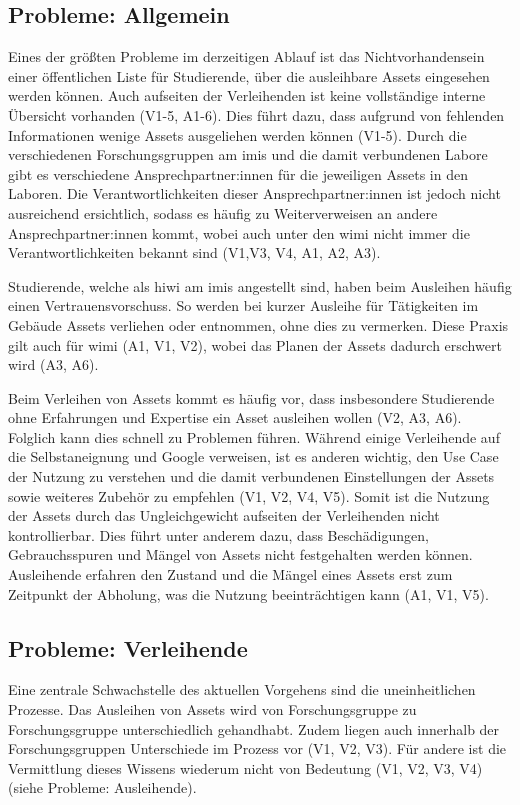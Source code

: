 \subsection{Probleme: Allgemein}
\label{section:probleme-allgemein}
Eines der größten Probleme im derzeitigen Ablauf ist das Nichtvorhandensein
einer öffentlichen Liste für Studierende, über die ausleihbare Assets eingesehen
werden können. Auch aufseiten der Verleihenden ist keine vollständige interne
Übersicht vorhanden (V1-5, A1-6). Dies führt dazu, dass aufgrund von fehlenden
Informationen wenige Assets ausgeliehen werden können (V1-5). Durch die
verschiedenen Forschungsgruppen am \ac{imis} und die damit verbundenen Labore
gibt es verschiedene Ansprechpartner:innen für die jeweiligen Assets in den
Laboren. Die Verantwortlichkeiten dieser Ansprechpartner:innen ist jedoch nicht
ausreichend ersichtlich, sodass es häufig zu Weiterverweisen an andere
Ansprechpartner:innen kommt, wobei auch unter den \ac{wimi} nicht immer die
Verantwortlichkeiten bekannt sind (V1,V3, V4, A1, A2, A3).

Studierende, welche als \ac{hiwi} am \ac{imis} angestellt sind, haben beim Ausleihen häufig einen
Vertrauensvorschuss. So werden bei kurzer Ausleihe für Tätigkeiten im Gebäude Assets verliehen oder
entnommen, ohne dies zu vermerken. Diese Praxis gilt auch für \ac{wimi} (A1, V1, V2), wobei das
Planen der Assets dadurch erschwert wird (A3, A6).

Beim Verleihen von Assets kommt es häufig vor, dass insbesondere Studierende
ohne Erfahrungen und Expertise ein Asset ausleihen wollen (V2, A3, A6). Folglich
kann dies schnell zu Problemen führen. Während einige Verleihende auf die
Selbstaneignung und Google verweisen, ist es anderen wichtig, den Use Case der
Nutzung zu verstehen und die damit verbundenen Einstellungen der Assets sowie
weiteres Zubehör zu empfehlen (V1, V2, V4, V5). Somit ist die Nutzung der Assets
durch das Ungleichgewicht aufseiten der Verleihenden nicht kontrollierbar. Dies
führt unter anderem dazu, dass Beschädigungen, Gebrauchsspuren und Mängel von
Assets nicht festgehalten werden können. Ausleihende erfahren den Zustand und
die Mängel eines Assets erst zum Zeitpunkt der Abholung, was die Nutzung
beeinträchtigen kann (A1, V1, V5).

\subsection{Probleme: Verleihende}
\label{section:probleme-verleihende}
Eine zentrale Schwachstelle des aktuellen Vorgehens sind die uneinheitlichen
Prozesse. Das Ausleihen von Assets wird von Forschungsgruppe zu Forschungsgruppe
unterschiedlich gehandhabt. Zudem liegen auch innerhalb der Forschungsgruppen
Unterschiede im Prozess vor (V1, V2, V3). Für andere ist die Vermittlung dieses
Wissens wiederum nicht von Bedeutung (V1, V2, V3, V4) (siehe Probleme:
Ausleihende).

